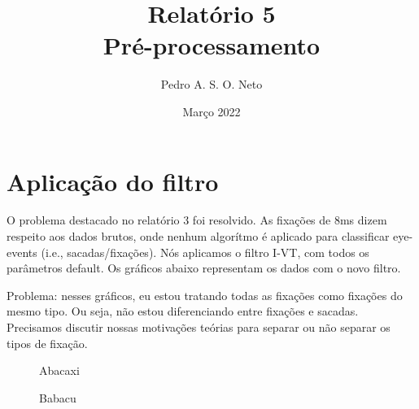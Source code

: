 \documentclass{article}
\title{Relatório 5 \\ Pré-processamento}
\author{Pedro A. S. O. Neto}
\date{Março 2022}
\begin{document}
\maketitle

\section{Aplicação do filtro}

O problema destacado no relatório 3 foi resolvido. As fixações de 8ms dizem respeito aos dados brutos, onde nenhum algorítmo é aplicado para classificar eye-events (i.e., sacadas/fixações).
Nós aplicamos o filtro I-VT, com todos os parâmetros default. Os gráficos abaixo representam os dados com o novo filtro.

Problema: nesses gráficos, eu estou tratando todas as fixações como fixações do mesmo tipo. Ou seja, não estou diferenciando entre fixações e sacadas. Precisamos discutir nossas motivações teórias para separar ou não separar os tipos de fixação.

\begin{figure}[t]
\caption{Abacaxi}
\noindent{}
\centering
\end{figure}

\begin{figure}[t]
\caption{Babacu}
\noindent{}
\centering
\end{figure}
\end{document}
